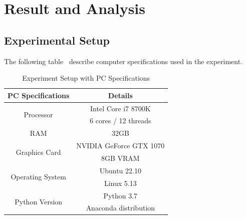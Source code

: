 \chapter{Result and Analysis}\label{ch:result-and-analysis}


\section{Experimental Setup}\label{sec:experimental-setup}
The following table~ describe computer specifications used in the experiment.
\begin{table}[htbp]
    \centering
    \caption{Experiment Setup with PC Specifications}
    \label{tab:experiment_setup}
    \begin{tabular}{|c|c|}
        \hline
        \textbf{PC Specifications}        & \textbf{Details}        \\
        \hline
        \multirow{2}{*}{Processor}        & Intel Core i7 8700K     \\
        & 6 cores / 12 threads    \\
        \hline
        RAM                              & 32GB                    \\
        \hline
        \multirow{2}{*}{Graphics Card}    & NVIDIA GeForce GTX 1070 \\
        & 8GB VRAM                \\
        \hline
        \multirow{2}{*}{Operating System} & Ubuntu 22.10            \\
        & Linux 5.13              \\
        \hline
        \multirow{2}{*}{Python Version}   & Python 3.7              \\
        & Anaconda distribution   \\
        \hline
    \end{tabular}
\end{table}

